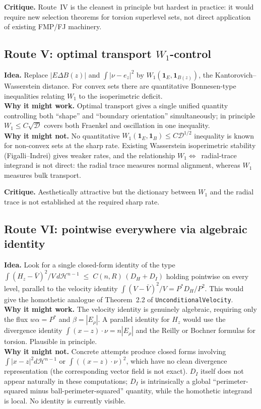 \documentclass[11pt]{article}
\theoremstyle{definition}
\newcommand{\Hn}{\mathcal H^{n-1}}
\newcommand{\dD}{\mathcal D}
\begin{document}
\textbf{Critique.}  Route~IV is the cleanest in principle but
hardest in practice: it would require new selection theorems for
torsion superlevel sets, not direct application of existing FMP/FJ
machinery.

\subsection{Route V: optimal transport $W_{1}$-control}\label{ssec:routeV}

\textbf{Idea.}  Replace $|E\Delta B(z)|$ and $\int|\nu-e_{z}|^{2}$ by
$W_{1}(\mathbf 1_{E},\mathbf 1_{B(z)})$, the Kantorovich--Wasserstein
distance.  For convex sets there are quantitative Bonnesen-type
inequalities relating $W_{1}$ to the isoperimetric deficit.\\
\textbf{Why it might work.}  Optimal transport gives a single
unified quantity controlling both ``shape'' and ``boundary
orientation'' simultaneously; in principle $W_{1}\le C\sqrt{\dD}$
covers both Fraenkel and oscillation in one inequality.\\
\textbf{Why it might not.}  No quantitative
$W_{1}(\mathbf 1_{E},\mathbf 1_{B})\le C\dD^{1/2}$ inequality is
known for non-convex sets at the sharp rate.  Existing Wasserstein
isoperimetric stability (Figalli--Indrei) gives weaker rates, and the
relationship $W_{1}\Leftrightarrow$~radial-trace integrand is not
direct: the radial trace measures normal alignment, whereas $W_{1}$
measures bulk transport.

\textbf{Critique.}  Aesthetically attractive but the dictionary
between $W_{1}$ and the radial trace is not established at the
required sharp rate.

\subsection{Route VI: pointwise everywhere via algebraic identity}
\label{ssec:routeVI}

\textbf{Idea.}  Look for a single closed-form identity of the type
$\int(H_{z}-\bar V)^{2}/V\,d\Hn\;\le\;C(n,R)\,(D_{H}+D_{I})$
holding pointwise on every level, parallel to the velocity identity
$\int(V-\bar V)^{2}/V=P^{*}D_{H}/P^{2}$.  This would give the
homothetic analogue of Theorem~2.2 of \texttt{UnconditionalVelocity}.\\
\textbf{Why it might work.}  The velocity identity is genuinely
algebraic, requiring only the flux $w\alpha=P^{*}$ and
$\beta=|E_{\rho}|$.  A parallel identity for $H_{z}$ would use the
divergence identity $\int(x-z)\cdot\nu=n|E_{\rho}|$ and the Reilly
or Bochner formulas for torsion.  Plausible in principle.\\
\textbf{Why it might not.}  Concrete attempts produce closed forms
involving $\int|x-z|^{2}d\Hn$ or $\int((x-z)\cdot\nu)^{2}$, which
have no clean divergence representation (the corresponding vector
field is not exact).  $D_{I}$ itself does not appear naturally in
these computations; $D_{I}$ is intrinsically a global
``perimeter-squared minus ball-perimeter-squared'' quantity, while
the homothetic integrand is local.  No identity is currently
visible.
\end{document}
